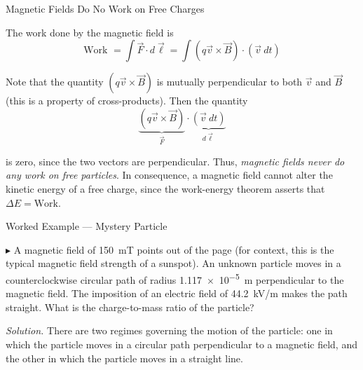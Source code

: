 \documentclass{beamer}
\begin{document}
\begin{frame}{Magnetic Fields Do No Work on Free Charges}

The work done by the magnetic field is
\begin{equation*}
    \text{Work } = \int \vec{F} \cdot d\vec{\ell} = \int \left( q\vec{v} \times \vec{B} \right) \cdot \left( \vec{v}\ dt \right)
\end{equation*}

Note that the quantity $\left(q\vec{v} \times \vec{B} \right)$ is mutually perpendicular to both $\vec{v}$ and $\vec{B}$ (this is a property of cross-products). Then the quantity
\begin{equation*}
    \underbrace{\left(q\vec{v} \times \vec{B} \right)}_{\displaystyle \vec{F}} \cdot \underbrace{\left( \vec{v}\ dt \right)}_{\displaystyle d\vec{\ell}}
\end{equation*}

is zero, since the two vectors are perpendicular. Thus, \emph{magnetic fields never do any work on free particles}. In consequence, a magnetic field cannot alter the kinetic energy of a free charge, since the work-energy theorem asserts that $\Delta E = \text{Work}$.

\end{frame}

\begin{frame}{Worked Example --- Mystery Particle}

$\blacktriangleright$ A magnetic field of \SI{150}{\milli\tesla} points out of the page (for context, this is the typical magnetic field strength of a sunspot). An unknown particle moves in a counterclockwise circular path of radius \SI{1.117e-5}{\metre} perpendicular to the magnetic field. The imposition of an electric field of \SI{44.2}{\kilo\volt/\metre} makes the path straight. What is the charge-to-mass ratio of the particle?

\vfill

\textit{Solution.} There are two regimes governing the motion of the particle: one in which the particle moves in a circular path perpendicular to a magnetic field, and the other in which the particle moves in a straight line.

\end{frame}
\end{document}
